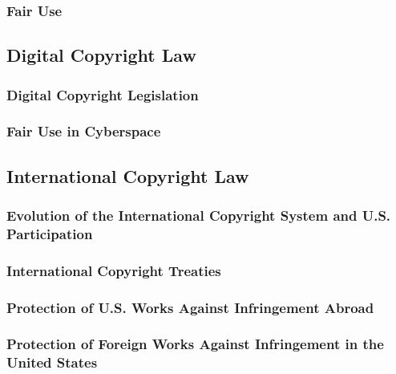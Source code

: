 
\subsubsection{Fair Use}



\subsection{Digital Copyright Law}

\subsubsection{Digital Copyright Legislation}


\subsubsection{Fair Use in Cyberspace}


\subsection{International Copyright Law}

\subsubsection{Evolution of the International Copyright System and U.S. 
Participation}


\subsubsection{International Copyright Treaties}


\subsubsection{Protection of U.S. Works Against Infringement Abroad}


\subsubsection{Protection of Foreign Works Against Infringement in the United 
States}


